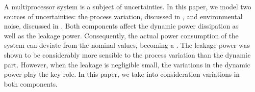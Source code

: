 A multiprocessor system is a subject of uncertainties. In this paper, we model two sources of uncertainties: the process variation, discussed in , and environmental noise, discussed in . Both components affect the dynamic power dissipation as well as the leakage power. Consequently, the actual power consumption of the system can deviate from the nominal values, becoming a \rv. The leakage power was shown to be considerably more sensible to the process variation than the dynamic part. However, when the leakage is negligible small, the variations in the dynamic power play the key role. In this paper, we take into consideration variations in both components.
